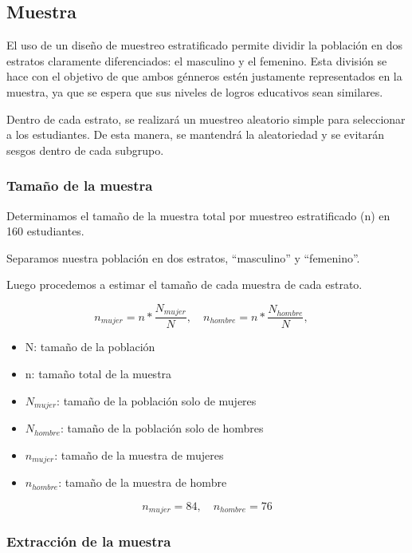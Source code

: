 \documentclass[
]{article}
\begin{document}
\subsection*{Muestra}\label{muestra}

El uso de un diseño de muestreo estratificado permite dividir la
población en dos estratos claramente diferenciados: el masculino y el
femenino. Esta división se hace con el objetivo de que ambos génneros
estén justamente representados en la muestra, ya que se espera que sus
niveles de logros educativos sean similares.

Dentro de cada estrato, se realizará un muestreo aleatorio simple para
seleccionar a los estudiantes. De esta manera, se mantendrá la
aleatoriedad y se evitarán sesgos dentro de cada subgrupo.

\subsubsection*{Tamaño de la muestra}\label{tamauxf1o-de-la-muestra}

Determinamos el tamaño de la muestra total por muestreo estratificado
(n) en 160 estudiantes.

Separamos nuestra población en dos estratos, ``masculino'' y
``femenino''.

Luego procedemos a estimar el tamaño de cada muestra de cada estrato.

\[n_{mujer}= n*\frac{N_{mujer}}{N}, \quad n_{hombre}= n*\frac{N_{hombre}}{N}, \quad \]

\begin{itemize}
    \item N: tamaño de la población 
    \item n: tamaño total de la muestra
    \item $N_{mujer}$: tamaño de la población solo de mujeres
    \item $N_{hombre}$: tamaño de la población solo de hombres
    \item $n_{mujer}$: tamaño de la muestra de mujeres
    \item $n_{hombre}$: tamaño de la muestra de hombre

\end{itemize}

\[n_{mujer}=84, \quad n_{hombre}=76 \]

\subsubsection*{Extracción de la
muestra}\label{extracciuxf3n-de-la-muestra}
\end{document}
